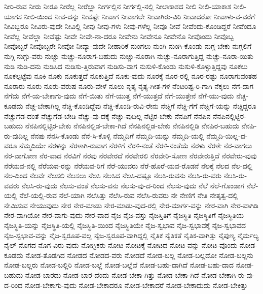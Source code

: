 {ನೀರಿ-ರುವ
ನೀರು
ನೀರೂ
ನೀರೆಲ್ಲ
ನೀರೆಲ್ಲಾ
ನೀರ್ಗಲ್ಲಿನ
ನೀರ್ಗಲ್ಲಿ-ನಲ್ಲಿ
ನೀಲಾಕಾಶದ
ನೀಲಿ
ನೀಲಿ-ಯಾಕಾಶ
ನೀಲಿ-ಯಾಗಸ
ನೀಲಿ-ಯಿಂದ
ನೀವ-ದನ್ನು
ನೀವಷ್ಟೇ
ನೀವಾಗ
ನೀವಾಗಲೇ
ನೀವಾಗಿರು-ವಿರಿ
ನೀವಾದರೋ
ನೀವಾಳು-ವ-ವರೆಗೆ
ನೀವಿಬ್ಬರೂ
ನೀವಿರು-ವುದೇ
ನೀವಿಲ್ಲಿ
ನೀವು
ನೀವು-ಗಳು
ನೀವು-ಗಳೆಲ್ಲ
ನೀವೂ
ನೀವೆ
ನೀವೆಂದು-ಕೊಂಡಿದ್ದರೆ
ನೀವೆಂದೂ
ನೀವೆಲ್ಲ
ನೀವೆಲ್ಲಾ
ನೀವೆಷ್ಟು
ನೀವೇ
ನೀವೇ-ನಾ-ದರೂ
ನೀವೇನು
ನೀವೇನೂ
ನೀವೇನೊ
ನೀವೊಂದು
ನೀವೊಬ್ಬ
ನೀವೊಬ್ಬರೆ
ನೀವೊಬ್ಬರೇ
ನೀವೋ
ನೀವ್ಯಾ-ವುದೇ
ನೀಹಾರಿಕೆ
ನುಂಗಲು
ನುಂಗಿ
ನುಂಗಿ-ಕೊಂಡು
ನುಗ್ಗ-ಬೇಕು
ನುಗ್ಗಲಿಗೆ
ನುಗ್ಗಿ
ನುಗ್ಗು-ವರು
ನುಚ್ಚು
ನುಚ್ಚು-ನೂರಾಗ-ಬಹುದು
ನುಚ್ಚು-ನೂರಾಗಿ
ನುಚ್ಚು-ನೂರಾಗುತ್ತಿದ್ದ
ನುಚ್ಚು-ನೂರಾ-ಯಿತು
ನುಡಿ
ನುಡಿ-ದನು
ನುಡಿಸಿದ
ನುಡಿಸು-ತ್ತಿರುವಾಗ
ನುಡಿಸು-ವಾಗ
ನುಸುಳಿ-ಕೊಂಡು
ನುಸುಳಿ-ಕೊಳ್ಳುತ್ತಿದ್ದವು
ನೂಕಲು
ನೂಕಲ್ಪಟ್ಟೆವು
ನೂಕಿ
ನೂಕು
ನೂಕುತ್ತದೆ
ನೂಕುತ್ತಿದೆ
ನೂಕು-ವುದು
ನೂರಕ್ಕೆ
ನೂರ-ರಲ್ಲಿ
ನೂರ-ರಷ್ಟು
ನೂರಾಗುವಂತಹ
ನೂರಾರು
ನೂರು
ನೂರು-ವರುಷ
ನೂರು-ವೇಳೆ
ನೂಲು
ನೃತ್ಯ
ನೃತ್ಯ-ಗೀತ-ಗಳ
ನೆಂಟರಿಷ್ಟ-ರಿ-ಗಾಗಿ
ನೆಕ್ಕಲು
ನೆಗೆ-ದಾಗ
ನೆಗೆದು
ನೆಗೆ-ಯ-ಬೇಕಾಗು-ವುದು
ನೆಗೆ-ಯಿತು
ನೆಗೆ-ಯುತ್ತ
ನೆಗೆ-ಯುತ್ತದೆ
ನೆಗೆ-ಯುತ್ತೇನೆ
ನೆಗೆ-ಯು-ವುದು
ನೆಚ್ಚ-ಕೂಡದು
ನೆಚ್ಚ-ಬೇಕಾಗಿಲ್ಲ
ನೆಚ್ಚಿ-ಕೊಂಡಿದ್ದೆವು
ನೆಚ್ಚಿ-ಕೊಂಡಿ-ರುವಿ-ರೇನು
ನೆಚ್ಚಿಗೆ
ನೆಚ್ಚಿ-ಗೆಗೆ
ನೆಚ್ಚಿಗೆ-ಯನ್ನು
ನೆಚ್ಚಿದ್ದರೂ
ನೆಚ್ಚುಗೆಡ-ದಂತೆ
ನೆಚ್ಚುಗೆಡ-ಬೇಡಿ
ನೆಚ್ಚು-ವು-ದಕ್ಕೆ
ನೆಚ್ಚು-ವುದಿಲ್ಲ
ನೆಟ್ಟಿರ-ಬೇಕು
ನೆನಪಿಗೆ
ನೆನಪಿನ
ನೆನಪಿನಲ್ಲಿಟ್ಟಿರ-ಬಹುದು
ನೆನಪಿನಲ್ಲಿಟ್ಟಿರ-ಬೇಕು
ನೆನಪಿನಲ್ಲಿಡ-ಬೇಕಾ-ಗಿದೆ
ನೆನಪಿನಲ್ಲಿಡ-ಬೇಕು
ನೆನಪಿನಲ್ಲಿಡಿ
ನೆನಪಿರ-ಬಹುದು
ನೆನಪಿ-ರು-ವುದಿಲ್ಲ
ನೆನಪು
ನೆನಸಿ-ಕೊಂಡು
ನೆನೆ-ಸಿ-ಕೊಳ್ಳಿ
ನೆಮ್ಮದಿಗೆ
ನೆಮ್ಮದಿ-ಯನ್ನು
ನೆಮ್ಮದಿ-ಯಲ್ಲಿ
ನೆಮ್ಮದಿ-ಯಿಲ್ಲ-ದ-ವರೂ
ನೆಮ್ಮದಿಯೇ
ನೆರಳನ್ನು
ನೆರಳಾಗಿ-ರುವಾಗ
ನೆರಳಿಗೆ
ನೆರಳಿ-ನಂತೆ
ನೆರಳಿ-ನಂತೆಯೆ
ನೆರಳು
ನೆರಳೇ
ನೆರ-ವಾಗಲು
ನೆರ-ವಾಗೋಣ
ನೆರ-ವಾದ
ನೆರವಿಗೆ
ನೆರವು
ನೆರವೇರದೆ
ನೆರವೇರಲಿ
ನೆರವೇರಿ-ಸೋಣ
ನೆರವೇರುತ್ತಿದೆ
ನೆರವೇರು-ವುವು
ನೆರೆಯವ-ನಲ್ಲಿ
ನೆರೆಯವ-ರನ್ನು
ನೆರೆಯವ-ರಿಗೆ
ನೆರೆ-ಯುವರು
ನೆರೆ-ಹೊರೆ-ಯವ-ರೊಡನೆ
ನೆಲಕ್ಕೆ
ನೆಲದ
ನೆಲ-ದಲ್ಲಿ
ನೆಲ-ದಿಂದ
ನೆಲವೇ
ನೆಲಸಲಿ
ನೆಲಸಲು
ನೆಲಸಿ
ನೆಲಸಿದ
ನೆಲಸಿ-ದಷ್ಟೂ
ನೆಲಸಿ-ರುವನು
ನೆಲಸಿ-ರು-ವರು
ನೆಲಸಿ-ರು-ವವರು
ನೆಲಸಿ-ರು-ವುದು
ನೆಲಸು-ವಂತೆ
ನೆಲಸು-ವನು
ನೆಲಸು-ವು-ದ-ರಿಂದ
ನೆಲಸು-ವುದು
ನೆಲೆ
ನೆಲೆ-ಗೊಂಡಾಗ
ನೆಲೆ-ಯಲ್ಲಿ
ನೆಲೆ-ಯಲ್ಲಿ-ರುವ
ನೆಲೆ-ಯಾಗಿ
ನೆಲೆಸಿತ್ತು
ನೆಲೆಸಿ-ರುವ
ನೆಲೆಸಿ-ರುವರು
ನೇ
ನೇಣಿಗೆ
ನೇತಿ
ನೇತೃತ್ವ-ದಲ್ಲಿ
ನೇಮಿಸುವ
ನೇಯುವುದು
ನೇರ
ನೇರ-ಮಾಡು
ನೇರ-ಮಾಡು-ವುದ-ರಲ್ಲಿ
ನೇರ-ಮಾರ್ಗ-ವನ್ನು
ನೇರ-ವಾಗಿ
ನೇರ-ವಾಗಿಡಿ
ನೇರ-ವಾಗಿಯೋ
ನೇರ-ವಾಗು-ವುದು
ನೇರ-ವಾದ
ನೈಜ
ನೈಜ-ವಸ್ತು
ನೈಜಸ್ತಿತಿಗೆ
ನೈಜಸ್ಥಿತಿ
ನೈಜಸ್ಥಿತಿಗೆ
ನೈಜಸ್ಥಿತಿಯ
ನೈಜಸ್ಥಿತಿ-ಯನ್ನು
ನೈಜಸ್ಥಿತಿ-ಯಲ್ಲಿ
ನೈಜಸ್ಥಿತಿ-ಯಿಂದ
ನೈಜಸ್ಥಿತಿಯೇ
ನೈಜ-ಸ್ವಭಾವ
ನೈಜ-ಸ್ವಭಾವಕ್ಕೆ
ನೈಜ-ಸ್ವಭಾವದ
ನೈಜ-ಸ್ವಭಾವ-ವನ್ನು
ನೈಜ-ಸ್ವರೂಪ-ವಲ್ಲ
ನೈಜ-ಸ್ವರೂಪ-ವಾಗಿದ್ದಲ್ಲಿ
ನೈತಿಕ
ನೈತಿಕತೆ
ನೈತಿಕ-ವಾಗಿತ್ತು
ನೈಪುಣ್ಯ
ನೈರ್ಮಲ್ಯ
ನೈಲ್
ನೊಗದ
ನೊಗ-ವಿರು-ವುದು
ನೋಗ್ಟಿಕರು
ನೋಟ
ನೋಟಕ್ಕೆ
ನೋಟದ
ನೋಟ-ವನ್ನು
ನೋಟ-ವೊಂದು
ನೋಡ-ಕೂಡದು
ನೋಡ-ತೊಡಗಿದ
ನೋಡದ
ನೋಡದ-ವರು
ನೋಡದೆ
ನೋಡ-ಬಲ್ಲ
ನೋಡ-ಬಲ್ಲದೋ
ನೋಡ-ಬಲ್ಲನು
ನೋಡ-ಬಲ್ಲರು
ನೋಡ-ಬಲ್ಲಿರಿ
ನೋಡ-ಬಲ್ಲೆ
ನೋಡ-ಬಲ್ಲೆವೆ
ನೋಡ-ಬಹು-ದಾಗಿದೆ
ನೋಡ-ಬಹು-ದಾದ
ನೋಡ-ಬಹುದು
ನೋಡ-ಬಾರದು
ನೋಡ-ಬಾರ-ದೆಂದು
ನೋಡ-ಬೇಕಾ-ಗಿತ್ತು
ನೋಡ-ಬೇಕಾ-ಗಿದೆ
ನೋಡ-ಬೇಕಾಗಿ-ರು-ವು-ದ-ರಿಂದ
ನೋಡ-ಬೇಕಾಗು-ವುದು
ನೋಡ-ಬೇಕಾದರೂ
ನೋಡ-ಬೇಕಾದರೆ
ನೋಡ-ಬೇಕಾದುದು
ನೋಡ-ಬೇಕಿತ್ತು
}
